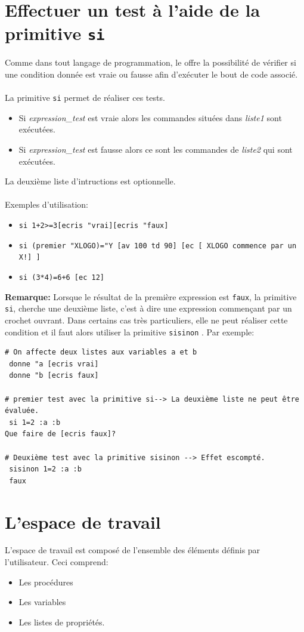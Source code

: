 \section{Effectuer un test à l'aide de la primitive \texttt{si}}
Comme dans tout langage de programmation, le \logo offre la possibilité de vérifier si une condition donnée est vraie ou fausse afin d'exécuter le bout de code associé.\\
\\
La primitive \texttt{si} permet de réaliser ces tests.\\
\begin{itemize}
 \item Si \textit{expression\_test} est vraie alors les commandes situées dans  \textit{liste1} sont exécutées.
 \item  Si \textit{expression\_test} est fausse alors ce sont les commandes de \textit{liste2} qui sont exécutées. 
\end{itemize}
La deuxième liste d'intructions est optionnelle.\\ \\
Exemples d'utilisation:
\begin{itemize}
\item \texttt{si 1+2>=3[ecris "vrai][ecris "faux]}
\item \texttt{si (premier "XLOGO)="Y  [av 100 td 90] [ec [ XLOGO commence par un X!] ]}
\item \texttt{si (3*4)=6+6 [ec 12]}
\end{itemize}
\vspace{0.2cm}
\textbf{Remarque:} Lorsque le résultat de la première expression est \texttt{faux}, la primitive \texttt{si}, cherche une deuxième liste, c'est à dire une expression commençant par un crochet ouvrant. Dans certains cas très particuliers, elle ne peut réaliser cette condition et il faut alors utiliser la primitive \texttt{sisinon} . Par exemple:
\begin{verbatim}
# On affecte deux listes aux variables a et b
 donne "a [ecris vrai]
 donne "b [ecris faux]

# premier test avec la primitive si--> La deuxième liste ne peut être évaluée.
 si 1=2 :a :b 
Que faire de [ecris faux]?

# Deuxième test avec la primitive sisinon --> Effet escompté.
 sisinon 1=2 :a :b
 faux
\end{verbatim}

\section{L'espace de travail}
L'espace de travail est composé de l'ensemble des éléments définis par l'utilisateur. Ceci comprend:
\begin{itemize}
 \item Les procédures
 \item Les variables
 \item Les listes de propriétés.
\end{itemize}

